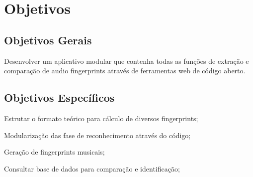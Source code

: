 \chapter{Objetivos}
\label{c.objetivos}

\section{Objetivos Gerais}
\label{s.objetivosgerais}

Desenvolver um aplicativo modular que contenha todas as funções de extração e comparação de audio fingerprints através de ferramentas web de código aberto.

\section{Objetivos Específicos}
\label{s.objetivosespecificos}

\begin{alineas}
	\item Estrutar o formato teórico para cálculo de diversos fingerprints;
	\item Modularização das fase de reconhecimento através do código;
	\item Geração de fingerprints musicais;
	\item Consultar base de dados para comparação e identificação;
\end{alineas}